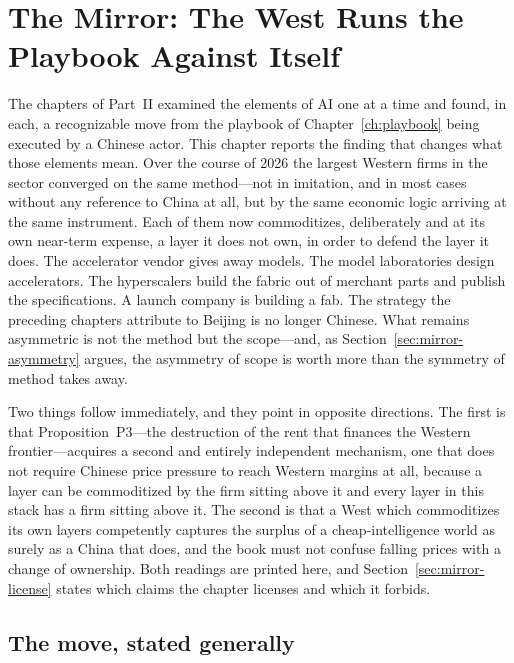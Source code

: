 \chapter{The Mirror: The West Runs the Playbook Against Itself}
\label{ch:mirror}

The chapters of Part~II examined the elements of AI one at a time and found, in each, a recognizable move from the playbook of Chapter~\ref{ch:playbook} being executed by a Chinese actor. This chapter reports the finding that changes what those elements mean. Over the course of 2026 the largest Western firms in the sector converged on the same method---not in imitation, and in most cases without any reference to China at all, but by the same economic logic arriving at the same instrument. Each of them now commoditizes, deliberately and at its own near-term expense, a layer it does not own, in order to defend the layer it does. The accelerator vendor gives away models. The model laboratories design accelerators. The hyperscalers build the fabric out of merchant parts and publish the specifications. A launch company is building a fab. The strategy the preceding chapters attribute to Beijing is no longer Chinese. What remains asymmetric is not the method but the scope---and, as Section~\ref{sec:mirror-asymmetry} argues, the asymmetry of scope is worth more than the symmetry of method takes away.

Two things follow immediately, and they point in opposite directions. The first is that Proposition~P3---the destruction of the rent that finances the Western frontier---acquires a second and entirely independent mechanism, one that does not require Chinese price pressure to reach Western margins at all, because a layer can be commoditized by the firm sitting above it and every layer in this stack has a firm sitting above it. The second is that a West which commoditizes its own layers competently captures the surplus of a cheap-intelligence world as surely as a China that does, and the book must not confuse falling prices with a change of ownership. Both readings are printed here, and Section~\ref{sec:mirror-license} states which claims the chapter licenses and which it forbids.

\section{The move, stated generally}
\label{sec:mirror-move}

